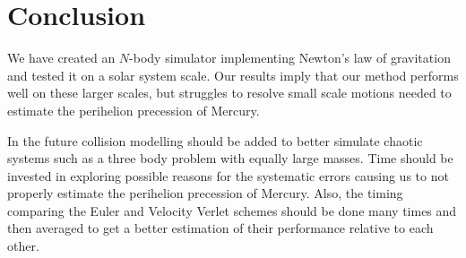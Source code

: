 \documentclass[twocolumn]{aastex62}
\begin{document}
\section{Conclusion} \label{sec:conclusion}
We have created an $N$-body simulator implementing Newton's law of 
gravitation and tested it on a solar system scale. Our results imply 
that our method performs well on these larger scales, but struggles to 
resolve small scale motions needed to estimate the perihelion precession 
of Mercury.

In the future collision modelling should be added to better simulate 
chaotic systems such as a three body problem with equally large masses. 
Time should be invested in exploring possible reasons for the systematic 
errors causing us to not properly estimate the perihelion precession 
of Mercury. Also, the timing comparing the Euler and Velocity Verlet 
schemes should be done many times and then averaged to get a better 
estimation of their performance relative to each other.
\nocite{jensen:2019}
\newpage


\end{document}
